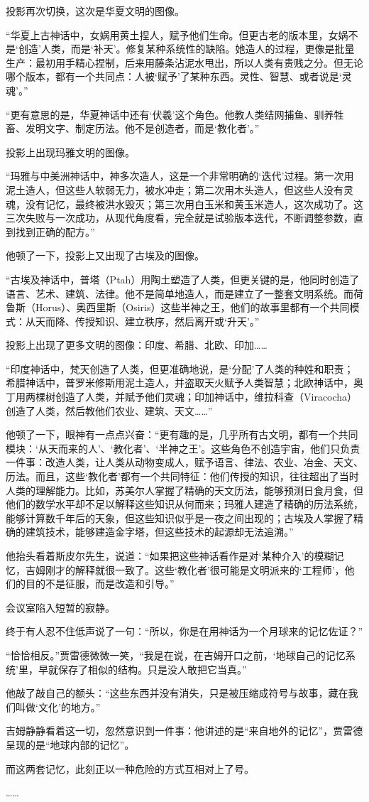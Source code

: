 投影再次切换，这次是华夏文明的图像。

“华夏上古神话中，女娲用黄土捏人，赋予他们生命。但更古老的版本里，女娲不是‘创造’人类，而是‘补天’。修复某种系统性的缺陷。她造人的过程，更像是批量生产：最初用手精心捏制，后来用藤条沾泥水甩出，所以人类有贵贱之分。但无论哪个版本，都有一个共同点：人被‘赋予’了某种东西。灵性、智慧、或者说是‘灵魂’。”

“更有意思的是，华夏神话中还有‘伏羲’这个角色。他教人类结网捕鱼、驯养牲畜、发明文字、制定历法。他不是创造者，而是‘教化者’。”

投影上出现玛雅文明的图像。

“玛雅与中美洲神话中，神多次造人，这是一个非常明确的‘迭代’过程。第一次用泥土造人，但这些人软弱无力，被水冲走；第二次用木头造人，但这些人没有灵魂，没有记忆，最终被洪水毁灭；第三次用白玉米和黄玉米造人，这次成功了。这三次失败与一次成功，从现代角度看，完全就是试验版本迭代，不断调整参数，直到找到正确的配方。”

他顿了一下，投影上又出现了古埃及的图像。

“古埃及神话中，普塔（Ptah）用陶土塑造了人类，但更关键的是，他同时创造了语言、艺术、建筑、法律。他不是简单地造人，而是建立了一整套文明系统。而荷鲁斯（Horus）、奥西里斯（Osiris）这些半神之王，他们的故事里都有一个共同模式：从天而降、传授知识、建立秩序，然后离开或‘升天’。”

投影上出现了更多文明的图像：印度、希腊、北欧、印加……

“印度神话中，梵天创造了人类，但更准确地说，是‘分配’了人类的种姓和职责；希腊神话中，普罗米修斯用泥土造人，并盗取天火赋予人类智慧；北欧神话中，奥丁用两棵树创造了人类，并赋予他们灵魂；印加神话中，维拉科查（Viracocha）创造了人类，然后教他们农业、建筑、天文……”

他顿了一下，眼神有一点点兴奋：“更有趣的是，几乎所有古文明，都有一个共同模块：‘从天而来的人’、‘教化者’、‘半神之王’。这些角色不创造宇宙，他们只负责一件事：改造人类，让人类从动物变成人，赋予语言、律法、农业、冶金、天文、历法。而且，这些‘教化者’都有一个共同特征：他们传授的知识，往往超出了当时人类的理解能力。比如，苏美尔人掌握了精确的天文历法，能够预测日食月食，但他们的数学水平却不足以解释这些知识从何而来；玛雅人建造了精确的历法系统，能够计算数千年后的天象，但这些知识似乎是一夜之间出现的；古埃及人掌握了精确的建筑技术，能够建造金字塔，但这些技术的起源却无法追溯。”

他抬头看着斯皮尔先生，说道：“如果把这些神话看作是对‘某种介入’的模糊记忆，吉姆刚才的解释就很一致了。这些‘教化者’很可能是文明派来的‘工程师’，他们的目的不是征服，而是改造和引导。”

会议室陷入短暂的寂静。

终于有人忍不住低声说了一句：“所以，你是在用神话为一个月球来的记忆佐证？”

“恰恰相反。”贾雷德微微一笑，“我是在说，在吉姆开口之前，‘地球自己的记忆系统’里，早就保存了相似的结构。只是没人敢把它当真。”

他敲了敲自己的额头：“这些东西并没有消失，只是被压缩成符号与故事，藏在我们叫做‘文化’的地方。”

吉姆静静看着这一切，忽然意识到一件事：他讲述的是“来自地外的记忆”，贾雷德呈现的是“地球内部的记忆”。

而这两套记忆，此刻正以一种危险的方式互相对上了号。

……
